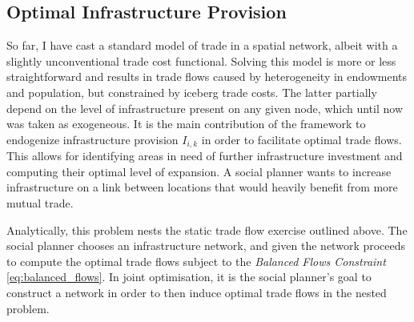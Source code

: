 \documentclass[11pt, oneside]{article}   	%
\begin{document}
\subsection{Optimal Infrastructure Provision}
So far, I have cast a standard model of trade in a spatial network, albeit with a slightly unconventional trade cost functional. Solving this model is more or less straightforward and results in trade flows caused by heterogeneity in endowments and population, but constrained by iceberg trade costs. The latter partially depend on the level of infrastructure present on any given node, which until now was taken as exogeneous. It is the main contribution of the \cite{Fajgelbaum_OptimalTransportNetworks_2017} framework to endogenize infrastructure provision $I_{i,k}$ in order to facilitate optimal trade flows. This allows for identifying areas in need of further infrastructure investment and computing their optimal level of expansion. A social planner wants to increase infrastructure on a link between locations that would heavily benefit from more mutual trade.

Analytically, this problem nests the static trade flow exercise outlined above. The social planner chooses an infrastructure network, and given the network proceeds to compute the optimal trade flows subject to the \emph{Balanced Flows Constraint} \eqref{eq:balanced_flows}. In joint optimisation, it is the social planner's goal to construct a network in order to then induce optimal trade flows in the nested problem.
\end{document}
